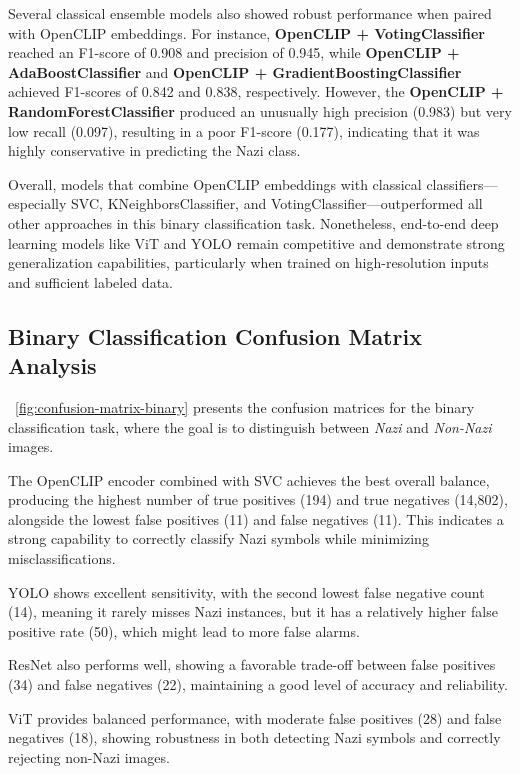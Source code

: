 Several classical ensemble models also showed robust performance when paired with OpenCLIP embeddings. For instance,
\textbf{OpenCLIP + VotingClassifier} reached an F1-score of 0.908 and precision of 0.945, while
\textbf{OpenCLIP + AdaBoostClassifier} and \textbf{OpenCLIP + GradientBoostingClassifier} achieved F1-scores of
0.842 and 0.838, respectively. However, the \textbf{OpenCLIP + RandomForestClassifier} produced an unusually high
precision (0.983) but very low recall (0.097), resulting in a poor F1-score (0.177), indicating that it was highly
conservative in predicting the Nazi class.

Overall, models that combine OpenCLIP embeddings with classical classifiers—especially \ac{SVC}, KNeighborsClassifier, and
VotingClassifier—outperformed all other approaches in this binary classification task. Nonetheless, end-to-end deep
learning models like \ac{ViT} and \ac{YOLO} remain competitive and demonstrate strong generalization capabilities,
particularly when trained on high-resolution inputs and sufficient labeled data.

\subsection{Binary Classification Confusion Matrix Analysis}

~\autoref{fig:confusion-matrix-binary} presents the confusion matrices for the binary classification task, where the
goal is to distinguish between \textit{Nazi} and \textit{Non-Nazi} images.

The OpenCLIP encoder combined with \ac{SVC} achieves the best overall balance, producing the
highest number of true positives (194) and true negatives (14,802), alongside the lowest false positives (11) and
false negatives (11). This indicates a strong capability to correctly classify Nazi symbols while minimizing
misclassifications.

\ac{YOLO} shows excellent sensitivity, with the second lowest false negative count (14), meaning it rarely misses Nazi
instances, but it has a relatively higher false positive rate (50), which might lead to more false alarms.

\ac{ResNet} also performs well, showing a favorable trade-off between false positives (34) and false negatives (22),
maintaining a good level of accuracy and reliability.

\ac{ViT} provides balanced performance, with moderate false positives (28) and false negatives (18), showing
robustness in both detecting Nazi symbols and correctly rejecting non-Nazi images.

